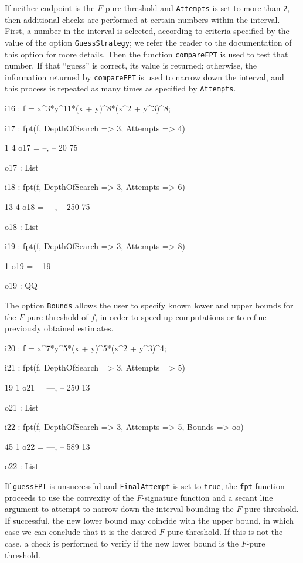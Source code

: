 \documentclass{amsart}
\begin{document}
If neither endpoint is the $F$-pure threshold and \texttt{Attempts} is set to more than \texttt{2}, then  additional checks are performed at certain numbers within the interval.
First, a number in the interval is selected, according to criteria specified by the value of the option \texttt{GuessStrategy}; we refer the reader to the documentation of this option for more details.
Then the function \texttt{compareFPT} is used to test that number. If that ``guess'' is correct, its value is returned; otherwise, the information returned by \texttt{compareFPT} is used to narrow down the interval, and this process is repeated as many times as specified by \texttt{Attempts}.

\smallskip
{\small
{}
\begin{MyVerbatim}
i16 : f = x^3*y^11*(x + y)^8*(x^2 + y^3)^8;

i17 : fpt(f, DepthOfSearch => 3, Attempts => 4)

        1   4
o17 = {--, --}
       20  75

o17 : List

i18 : fpt(f, DepthOfSearch => 3, Attempts => 6)

        13   4
o18 = {---, --}
       250  75

o18 : List

i19 : fpt(f, DepthOfSearch => 3, Attempts => 8) 

       1
o19 = --
      19

o19 : QQ
\end{MyVerbatim}
}
\smallskip


The option \texttt{Bounds} allows the user to specify known lower and upper bounds for the $F$-pure threshold of $f$, in order to speed up computations or to refine previously obtained estimates.

\smallskip
{\small
{}
\begin{MyVerbatim}
i20 : f = x^7*y^5*(x + y)^5*(x^2 + y^3)^4;

i21 : fpt(f, DepthOfSearch => 3, Attempts => 5)

        19   1
o21 = {---, --}
       250  13

o21 : List

i22 : fpt(f, DepthOfSearch => 3, Attempts => 5, Bounds => oo)

        45   1
o22 = {---, --}
       589  13

o22 : List
\end{MyVerbatim}
}
\smallskip

If \texttt{guessFPT} is unsuccessful and \texttt{FinalAttempt} is set to \texttt{true}, the \texttt{fpt} function proceeds to use the convexity of the $F$-signature function and a secant line argument to attempt to narrow down the interval bounding the $F$-pure threshold.
If successful, the new lower bound may coincide with the upper bound, in which case we can conclude that it is the desired $F$-pure threshold.
If this is not the case, a check is performed to verify if the new lower bound is the $F$-pure threshold.
\end{document}
